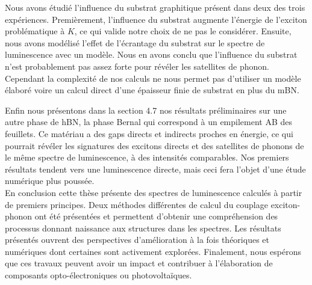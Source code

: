 Nous avons étudié l'influence du substrat graphitique présent dans deux des trois expériences. Premièrement, l'influence du substrat augmente l'énergie de l'exciton problématique à $K$, ce qui valide notre choix de ne pas le considérer. Ensuite, nous avons modélisé l'effet de l'écrantage du substrat sur le spectre de luminescence avec un modèle. Nous en avons conclu que l'influence du substrat n'est probablement pas assez forte pour révéler les satellites de phonon. Cependant la complexité de nos calculs ne nous permet pas d'utiliser un modèle élaboré voire un calcul direct d'une épaisseur finie de substrat en plus du mBN. 

Enfin nous présentons dans la section 4.7 nos résultats préliminaires sur une autre phase de hBN, la phase Bernal qui correspond à un empilement AB des feuillets. Ce matériau a des gaps directs et indirects proches en énergie, ce qui pourrait révéler les signatures des excitons directs et des satellites de phonons de le même spectre de luminescence, à des intensités comparables. Nos premiers résultats tendent vers une luminescence directe, mais ceci fera l'objet d'une étude numérique plus poussée.\\


En conclusion cette thèse présente des spectres de luminescence calculés à partir de premiers principes. Deux méthodes différentes de calcul du couplage exciton-phonon ont été présentées et permettent d'obtenir une compréhension des processus donnant naissance aux structures dans les spectres.
Les résultats présentés ouvrent des perspectives d'amélioration à la fois théoriques et numériques dont certaines sont activement explorées.
Finalement, nous espérons que ces travaux peuvent avoir un impact et contribuer à l'élaboration de composants opto-électroniques ou photovoltaïques. 